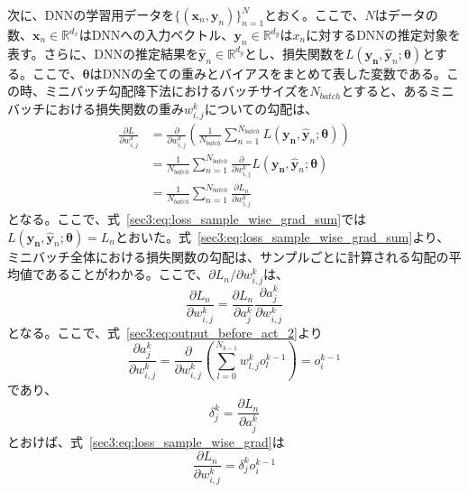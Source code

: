 \documentclass[12pt]{jarticle}
\numberwithin{equation}{section}    %
\numberwithin{figure}{section}      %
\numberwithin{table}{section}      %
\begin{document}
次に、DNNの学習用データを$\{(\bm{x}_{n}, \bm{y}_{n})\}_{n = 1}^{N}$とおく。ここで、$N$はデータの数、$\bm{x}_{n} \in \mathbb{R}^{d_{x}}$はDNNへの入力ベクトル、$\bm{y}_{n} \in \mathbb{R}^{d_{y}}$は$x_{n}$に対するDNNの推定対象を表す。さらに、DNNの推定結果を$\hat{\bm{y}}_{n} \in \mathbb{R}^{d_{y}}$とし、損失関数を$L(\bm{y_{n}}, \hat{\bm{y}}_{n} ; \bm{\theta})$とする。ここで、$\bm{\theta}$はDNNの全ての重みとバイアスをまとめて表した変数である。この時、ミニバッチ勾配降下法におけるバッチサイズを$N_{batch}$とすると、あるミニバッチにおける損失関数の重み$w_{i, j}^{k}$についての勾配は、
\begin{align}
    \frac{\partial L}{\partial w_{i, j}^{k}} & = \frac{\partial}{\partial w_{i, j}^{k}} \left(\frac{1}{N_{batch}} \sum_{n = 1}^{N_{batch}} L(\bm{y_{n}}, \hat{\bm{y}}_{n}; \bm{\theta})\right) \\
                                             & = \frac{1}{N_{batch}} \sum_{n = 1}^{N_{batch}} \frac{\partial}{\partial w_{i, j}^{k}} L(\bm{y_{n}}, \hat{\bm{y}}_{n}; \bm{\theta})              \\
                                             & = \frac{1}{N_{batch}} \sum_{n = 1}^{N_{batch}} \frac{\partial L_{n}}{\partial w_{i, j}^{k}} \label{sec3:eq:loss_sample_wise_grad_sum}
\end{align}
となる。ここで、式~\eqref{sec3:eq:loss_sample_wise_grad_sum}では$L(\bm{y_{n}}, \hat{\bm{y}}_{n}; \bm{\theta}) = L_{n}$とおいた。式~\eqref{sec3:eq:loss_sample_wise_grad_sum}より、ミニバッチ全体における損失関数の勾配は、サンプルごとに計算される勾配の平均値であることがわかる。ここで、$\partial L_{n} / \partial w_{i, j}^{k}$は、
\begin{equation}
    \label{sec3:eq:loss_sample_wise_grad}
    \frac{\partial L_{n}}{\partial w_{i, j}^{k}} = \frac{\partial L_{n}}{\partial a_{j}^{k}} \frac{\partial a_{j}^{k}}{\partial w_{i, j}^{k}}
\end{equation}
となる。ここで、式~\eqref{sec3:eq:output_before_act_2}より
\begin{equation}
    \frac{\partial a_{j}^{k}}{\partial w_{i, j}^{k}} = \frac{\partial}{\partial w_{i, j}^{k}} \left( \sum_{l = 0}^{N_{k - 1}} w_{l, j}^{k}o_{l}^{k - 1} \right) = o_{i}^{k - 1}
\end{equation}
であり、
\begin{equation}
    \delta_{j}^{k} = \frac{\partial L_{n}}{\partial a_{j}^{k}}
\end{equation}
とおけば、式~\eqref{sec3:eq:loss_sample_wise_grad}は
\begin{equation}
    \frac{\partial L_{n}}{\partial w_{i, j}^{k}} = \delta_{j}^{k} o_{i}^{k - 1}
\end{equation}
\end{document}

